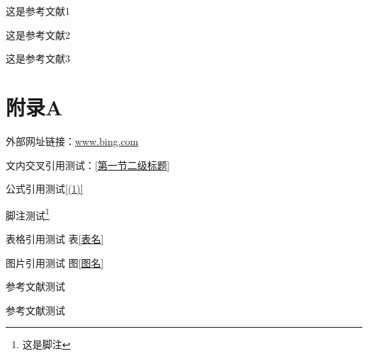 \documentclass[a4paper,AutoFakeBold={2.7}]{ctexart} %
\begin{document}
\begin{thebibliography}{99}
	这是参考文献1
	
	这是参考文献2
	
	这是参考文献3
\end{thebibliography}
\section*{附录A}
外部网址链接：\url{www.bing.com}

文内交叉引用测试：\ref{第一节二级标题}

公式引用测试\ref{(1)}

脚注测试\footnote{这是脚注}

表格引用测试 表\ref{表名}

图片引用测试 图\ref{图名}

参考文献测试\textsuperscript{\cite{参考文献1}}

参考文献测试\textsuperscript{\cite{参考文献1}\cite{参考文献2}}
\end{document}
